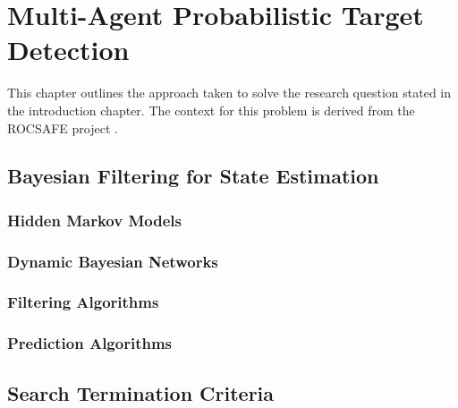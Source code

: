 \chapter{Multi-Agent Probabilistic Target Detection}
\placeholder{}
This chapter outlines the approach taken to solve the research question stated in the introduction chapter. The context for this problem is derived from the ROCSAFE project \cite{rocsafeNUIG}. 

\section{Bayesian Filtering for State Estimation}

\subsection{Hidden Markov Models}


\subsection{Dynamic Bayesian Networks}


\subsection{Filtering Algorithms}


\subsection{Prediction Algorithms}




\section{Search Termination Criteria}

